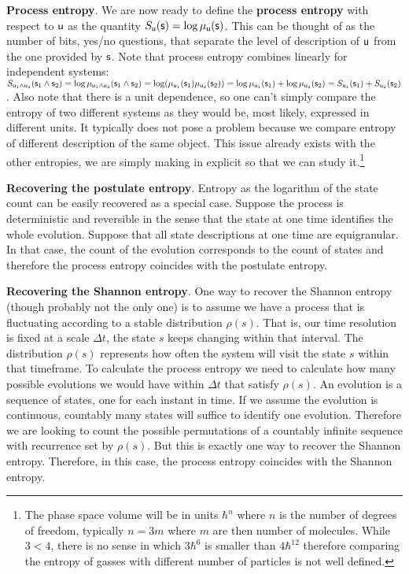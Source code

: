 \documentclass[10pt, onecolumn, longbibliography, nofootinbib]{revtex4-2}
\begin{document}
\textbf{Process entropy}. We are now ready to define the \textbf{process entropy} with respect to $\stmt[u]$ as the quantity $S_{\stmt[u]}(\stmt) = \log \mu_{\stmt[u]}(\stmt)$. This can be thought of as the number of bits, yes/no questions, that separate the level of description of $\stmt[u]$ from the one provided by $\stmt$. Note that process entropy combines linearly for independent systems: $S_{\stmt[u]_1 \AND \stmt[u]_2}(\stmt_1 \AND \stmt_2) = \log \mu_{\stmt[u]_1 \AND \stmt[u]_2}(\stmt_1 \AND \stmt_2) = \log (\mu_{\stmt[u]_1}(\stmt_1) \mu_{\stmt[u]_2}(\stmt_2)) = \log \mu_{\stmt[u]_1}(\stmt_1) + \log \mu_{\stmt[u]_2}(\stmt_2) = S_{\stmt[u]_1}(\stmt_1) + S_{\stmt[u]_2}(\stmt_2)$. Also note that there is a unit dependence, so one can't simply compare the entropy of two different systems as they would be, most likely, expressed in different units.  It typically does not pose a problem because we compare entropy of different description of the same object. This issue already exists with the other entropies, we are simply making in explicit so that we can study it.\footnote{The phase space volume will be in units $\hbar^n$ where $n$ is the number of degrees of freedom, typically $n=3m$ where $m$ are then number of molecules. While $3 < 4$, there is no sense in which $3 \hbar^6$ is smaller than $4 \hbar^{12}$ therefore comparing the entropy of gasses with different number of particles is not well defined.}

\textbf{Recovering the postulate entropy}. Entropy as the logarithm of the state count can be easily recovered as a special case. Suppose the process is deterministic and reversible in the sense that the state at one time identifies the whole evolution. Suppose that all state descriptions at one time are equigranular. In that case, the count of the evolution corresponds to the count of states and therefore the process entropy coincides with the postulate entropy.

\textbf{Recovering the Shannon entropy}. One way to recover the Shannon entropy (though probably not the only one) is to assume we have a process that is fluctuating according to a stable distribution $\rho(s)$. That is, our time resolution is fixed at a scale $\Delta t$, the state $s$ keeps changing within that interval. The distribution $\rho(s)$ represents how often the system will visit the state $s$ within that timeframe. To calculate the process entropy we need to calculate how many possible evolutions we would have within $\Delta t$ that satisfy $\rho(s)$. An evolution is a sequence of states, one for each instant in time. If we assume the evolution is continuous, countably many states will suffice to identify one evolution. Therefore we are looking to count the possible permutations of a countably infinite sequence with recurrence set by $\rho(s)$. But this is exactly one way to recover the Shannon entropy. Therefore, in this case, the process entropy coincides with the Shannon entropy.
\end{document}
